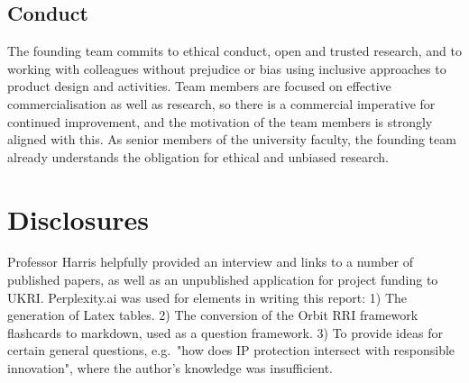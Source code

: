 \documentclass[runningheads]{llncs}
\begin{document}
\subsection{Conduct}
    The founding team commits to ethical conduct, open and trusted research, and to working with colleagues without prejudice or bias using inclusive approaches to product design and activities. Team members are focused on effective commercialisation as well as research, so there is a commercial imperative for continued improvement, and the motivation of the team members is strongly aligned with this. As senior members of the university faculty, the founding team already understands the obligation for ethical and unbiased research.
\section{Disclosures}
    Professor Harris helpfully provided an interview and links to a number of published papers, as well as an unpublished application for project funding to UKRI. Perplexity.ai was used for elements in writing this report: 1) The generation of Latex tables. 2) The conversion of the Orbit RRI framework flashcards to markdown, used as a question framework. 3) To provide ideas for certain general questions, e.g.\ "how does IP protection intersect with responsible innovation", where the author's knowledge was insufficient.


\end{document}
